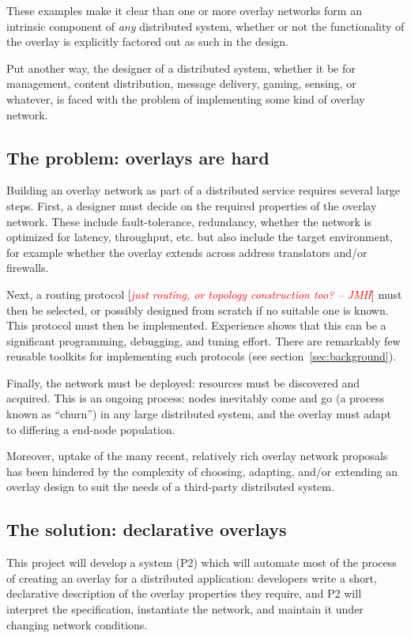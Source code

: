\documentclass[twocolumn,10pt]{article}
\newcommand{\note}[1]{[\textcolor{red}{\textit{#1}}]}
\def\Sys{P2\xspace}
\begin{document}
These examples make it clear than one or more overlay networks
form an intrinsic component of \emph{any} distributed system, whether
or not the functionality of the overlay is explicitly factored out as
such in the design.   

Put another way, the designer of a distributed system, whether it be
for management, content distribution, message delivery, gaming,
sensing, or whatever, is faced with the problem of implementing some
kind of overlay network. 

\subsection{The problem: overlays are hard}

Building an overlay network as part of a distributed service
requires several large steps.  First, a designer must decide on the
required properties of the overlay network.  These include
fault-tolerance, redundancy, whether the network is optimized for
latency, throughput, etc. but also include the target environment, for
example whether the overlay extends across address translators and/or
firewalls.

Next, a routing protocol \note{just routing, or topology construction
too? -- JMH} must then be selected, or possibly designed
from scratch if no suitable one is known.  This protocol must then be
implemented.  Experience shows that this can be a significant
programming, debugging, and tuning effort.   There are remarkably few
reusable toolkits for implementing such protocols (see
section~\ref{sec:background}). 

Finally, the network must be deployed: resources must be discovered
and acquired. This is an ongoing process: nodes inevitably come and go
(a process known as ``churn'') in any large distributed system, and
the overlay must adapt to differing a end-node population.  

Moreover, uptake of the many recent, relatively rich
overlay network proposals has been hindered by the complexity of
choosing, adapting, and/or extending an overlay design to suit the needs
of a third-party distributed system.

\subsection{The solution: declarative overlays}

This project will develop a system (\Sys) which will automate most of
the process of creating an overlay for a distributed application:
developers write a short, declarative description of the overlay
properties they require, and \Sys will interpret the specification,
instantiate the network, and maintain it under changing network
conditions. 
\end{document}
